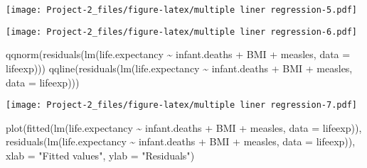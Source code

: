 \documentclass[
]{article}
\newenvironment{Shaded}{\begin{snugshade}}{\end{snugshade}}
\newcommand{\AttributeTok}[1]{\textcolor[rgb]{0.77,0.63,0.00}{#1}}
\newcommand{\FunctionTok}[1]{\textcolor[rgb]{0.00,0.00,0.00}{#1}}
\newcommand{\NormalTok}[1]{#1}
\newcommand{\SpecialCharTok}[1]{\textcolor[rgb]{0.00,0.00,0.00}{#1}}
\newcommand{\StringTok}[1]{\textcolor[rgb]{0.31,0.60,0.02}{#1}}
\begin{document}
\texttt{[image: Project-2\_files/figure-latex/multiple liner regression-5.pdf]}

\begin{Shaded}
\end{Shaded}

\texttt{[image: Project-2\_files/figure-latex/multiple liner regression-6.pdf]}

\begin{Shaded}
\begin{Highlighting}[]
\FunctionTok{qqnorm}\NormalTok{(}\FunctionTok{residuals}\NormalTok{(}\FunctionTok{lm}\NormalTok{(life.expectancy }\SpecialCharTok{\textasciitilde{}}\NormalTok{ infant.deaths }\SpecialCharTok{+}\NormalTok{ BMI }\SpecialCharTok{+}\NormalTok{ measles, }\AttributeTok{data =}\NormalTok{ lifeexp)))}
\FunctionTok{qqline}\NormalTok{(}\FunctionTok{residuals}\NormalTok{(}\FunctionTok{lm}\NormalTok{(life.expectancy }\SpecialCharTok{\textasciitilde{}}\NormalTok{ infant.deaths }\SpecialCharTok{+}\NormalTok{ BMI }\SpecialCharTok{+}\NormalTok{ measles, }\AttributeTok{data =}\NormalTok{ lifeexp)))}
\end{Highlighting}
\end{Shaded}

\texttt{[image: Project-2\_files/figure-latex/multiple liner regression-7.pdf]}

\begin{Shaded}
\begin{Highlighting}[]
\FunctionTok{plot}\NormalTok{(}\FunctionTok{fitted}\NormalTok{(}\FunctionTok{lm}\NormalTok{(life.expectancy }\SpecialCharTok{\textasciitilde{}}\NormalTok{ infant.deaths }\SpecialCharTok{+}\NormalTok{ BMI }\SpecialCharTok{+}\NormalTok{ measles, }\AttributeTok{data =}\NormalTok{ lifeexp)), }
     \FunctionTok{residuals}\NormalTok{(}\FunctionTok{lm}\NormalTok{(life.expectancy }\SpecialCharTok{\textasciitilde{}}\NormalTok{ infant.deaths }\SpecialCharTok{+}\NormalTok{ BMI }\SpecialCharTok{+}\NormalTok{ measles, }\AttributeTok{data =}\NormalTok{ lifeexp)), }
     \AttributeTok{xlab =} \StringTok{"Fitted values"}\NormalTok{, }\AttributeTok{ylab =} \StringTok{"Residuals"}\NormalTok{)}
\end{Highlighting}
\end{Shaded}
\end{document}
